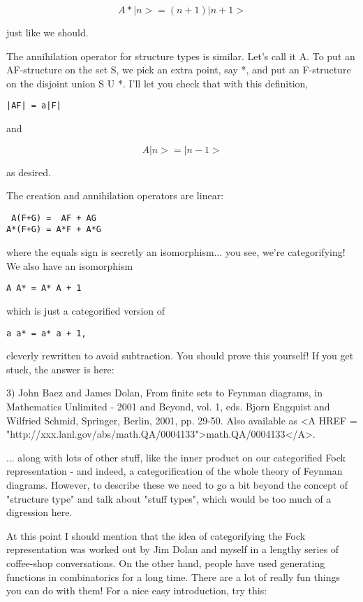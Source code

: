$$
A*|n> = (n+1) |n+1>
$$
    
just like we should. 

The annihilation operator for structure types is similar.  Let's call it
A.  To put an AF-structure on the set S, we pick an extra point, say *,
and put an F-structure on the disjoint union S U {*}.  I'll let you
check that with this definition,

\begin{verbatim}
|AF| = a|F|
\end{verbatim}
    
and

$$
A|n> = |n-1>
$$
    
as desired.

The creation and annihilation operators are linear:

\begin{verbatim}
 A(F+G) =  AF + AG
A*(F+G) = A*F + A*G
\end{verbatim}
    
where the equals sign is secretly an isomorphism... you see, we're
categorifying!  We also have an isomorphism

\begin{verbatim}
A A* = A* A + 1
\end{verbatim}
    
which is just a categorified version of 

\begin{verbatim}
a a* = a* a + 1,
\end{verbatim}
    
cleverly rewritten to avoid subtraction.   You should prove this 
yourself!  If you get stuck, the answer is here:

3) John Baez and James Dolan, From finite sets to Feynman diagrams,
in Mathematics Unlimited - 2001 and Beyond, vol. 1, eds. Bjorn
Engquist and Wilfried Schmid, Springer, Berlin, 2001, pp. 29-50. 
Also available as <A HREF = "http://xxx.lanl.gov/abs/math.QA/0004133">math.QA/0004133</A>.

... along with lots of other stuff, like the inner product on our
categorified Fock representation - and indeed, a categorification of 
the whole theory of Feynman diagrams.  However, to describe these we 
need to go a bit beyond the concept of "structure type" and
talk about
"stuff types", which would be too much of a digression here.

At this point I should mention that the idea of categorifying the Fock
representation was worked out by Jim Dolan and myself in a lengthy
series of coffee-shop conversations.   On the other hand, people have
used generating functions in combinatorics for a long time.  There
are a lot of really fun things you can do with them!  For a nice easy
introduction, try this:

